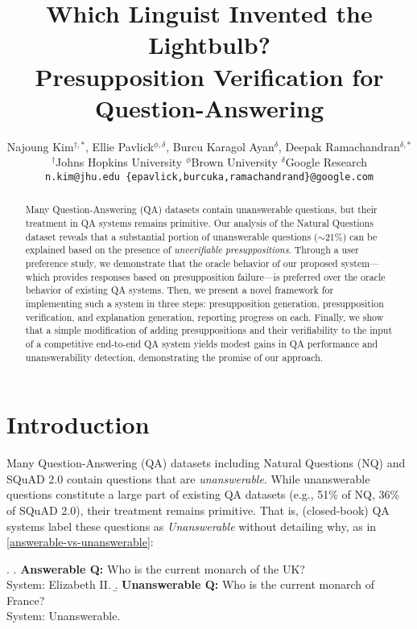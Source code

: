 \documentclass[11pt,a4paper]{article}
\title{Which Linguist Invented the Lightbulb?\\Presupposition Verification for Question-Answering}
\author{
 Najoung Kim$^{\dagger, *}$, Ellie Pavlick$^{\phi,\delta}$, Burcu Karagol Ayan$^\delta$, Deepak Ramachandran$^{\delta, *}$\\
 $^\dagger$Johns Hopkins University  $^\phi$Brown University  $^\delta$Google Research\\
 \texttt{n.kim@jhu.edu \{epavlick,burcuka,ramachandrand\}@google.com}
}
\date{}
\begin{document}
\maketitle

\begin{abstract}
  Many Question-Answering (QA) datasets contain unanswerable questions, but their treatment in QA systems remains primitive. Our analysis of the Natural Questions \citep{kwiatkowski-etal-2019-natural} dataset reveals that a substantial portion of unanswerable questions ($\sim$21\%) can be explained based on the presence of \emph{unverifiable presuppositions}. Through a user preference study, we demonstrate that the oracle behavior of our proposed system---which provides responses based on presupposition failure---is preferred over the oracle behavior of existing QA systems. Then, we present a novel framework for implementing such a system in three steps: presupposition generation, presupposition verification, and explanation generation, reporting progress on each. Finally, we show that a simple modification of adding presuppositions and their verifiability to the input of a competitive end-to-end QA system yields modest gains in QA performance and unanswerability detection, demonstrating the promise of our approach.
\end{abstract}

{\let\thefootnote\relax{}}

\section{Introduction}
Many Question-Answering (QA) datasets including Natural Questions (NQ) \citep{kwiatkowski-etal-2019-natural} and SQuAD 2.0 \citep{rajpurkar-etal-2018-know} contain questions that are \textit{unanswerable}. While unanswerable questions constitute a large part of existing QA datasets (e.g., 51\% of NQ, 36\% of SQuAD 2.0), their treatment remains primitive. That is, (closed-book) QA systems label these questions as \textit{Unanswerable} without detailing why, as in \ref{answerable-vs-unanswerable}:

\ex. \label{answerable-vs-unanswerable}
\a. \textbf{Answerable Q:} Who is the current monarch of the UK? \\
System: Elizabeth II.
\b. \label{answerable-vs-unanswerable-b}
\textbf{Unanswerable Q:} Who is the current monarch of France? \\
System: Unanswerable.
\end{document}
